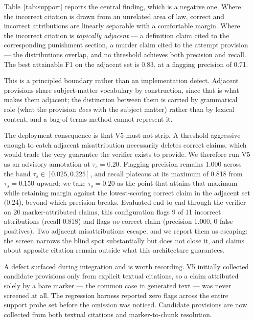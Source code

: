 \documentclass[conference]{IEEEtran}
\begin{document}
Table~\ref{tab:support} reports the central finding, which is a negative one.
Where the incorrect citation is drawn from an unrelated area of law, correct and
incorrect attributions are linearly separable with a comfortable margin. Where
the incorrect citation is \emph{topically adjacent} --- a definition claim cited
to the corresponding punishment section, a murder claim cited to the attempt
provision --- the distributions overlap, and no threshold achieves both
precision and recall. The best attainable F1 on the adjacent set is 0.83, at a
flagging precision of 0.71.

This is a principled boundary rather than an implementation defect. Adjacent
provisions share subject-matter vocabulary by construction, since that is what
makes them adjacent; the distinction between them is carried by grammatical role
(what the provision \emph{does} with the subject matter) rather than by lexical
content, and a bag-of-terms method cannot represent it.

The deployment consequence is that V5 must not strip. A threshold aggressive
enough to catch adjacent misattribution necessarily deletes correct claims,
which would trade the very guarantee the verifier exists to provide. We
therefore run V5 as an advisory annotation at $\tau_{s} = 0.20$. Flagging
precision remains 1.000 across the band $\tau_{s} \in [0.025, 0.225]$, and recall
plateaus at its maximum of 0.818 from $\tau_{s} = 0.150$ upward; we take
$\tau_{s} = 0.20$ as the point that attains that maximum while retaining margin
against the lowest-scoring correct claim in the adjacent set (0.24), beyond
which precision breaks. Evaluated end to end
through the verifier on 20 marker-attributed claims, this configuration flags 9
of 11 incorrect attributions (recall 0.818) and flags \emph{no} correct claim
(precision 1.000, 0 false positives). Two adjacent misattributions escape, and
we report them as escaping: the screen narrows the blind spot substantially but
does not close it, and claims about apposite citation remain outside what this
architecture guarantees.

A defect surfaced during integration and is worth recording. V5 initially
collected candidate provisions only from explicit textual citations, so a claim
attributed solely by a bare marker --- the common case in generated text --- was
never screened at all. The regression harness reported zero flags across the
entire support probe set before the omission was noticed. Candidate provisions
are now collected from both textual citations and marker-to-chunk resolution.
\end{document}
